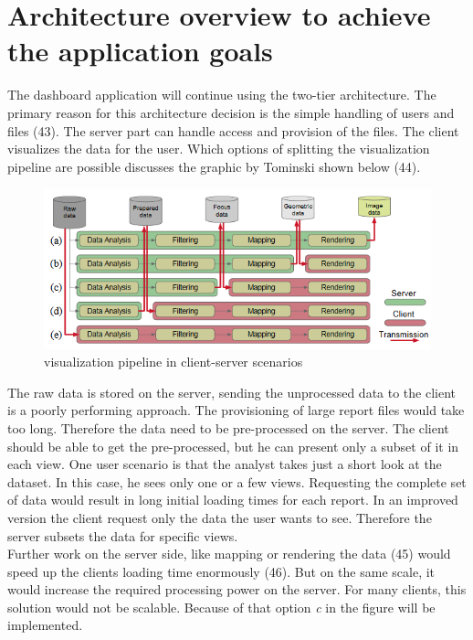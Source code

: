 \documentclass[american,a4paper,oneside,,tablecaptionabove]{scrbook}
\begin{document}
\section{Architecture overview to achieve the application
goals}\label{architecture-overview-to-achieve-the-application-goals}

The dashboard application will continue using the two-tier architecture.
The primary reason for this architecture decision is the simple handling
of users and files (43). The server part can handle access and provision
of the files. The client visualizes the data for the user. Which options
of splitting the visualization pipeline are possible discusses the
graphic by Tominski shown below (44).

\begin{figure}
\centering
\includegraphics{images/visualization pipeline in client-server scenarios.PNG}
\caption{visualization pipeline in client-server scenarios}
\end{figure}

The raw data is stored on the server, sending the unprocessed data to
the client is a poorly performing approach. The provisioning of large
report files would take too long. Therefore the data need to be
pre-processed on the server. The client should be able to get the
pre-processed, but he can present only a subset of it in each view. One
user scenario is that the analyst takes just a short look at the
dataset. In this case, he sees only one or a few views. Requesting the
complete set of data would result in long initial loading times for each
report. In an improved version the client request only the data the user
wants to see. Therefore the server subsets the data for specific
views.\\
Further work on the server side, like mapping or rendering the data (45)
would speed up the clients loading time enormously (46). But on the same
scale, it would increase the required processing power on the server.
For many clients, this solution would not be scalable. Because of that
option \emph{c} in the figure will be implemented.
\end{document}
